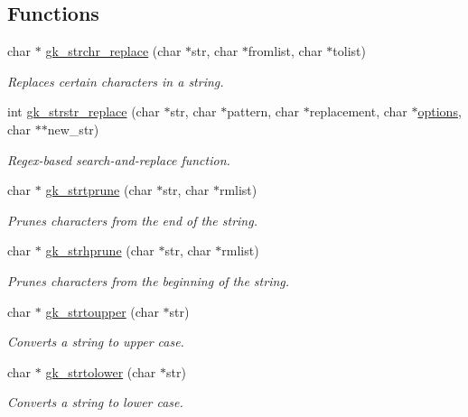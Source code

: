 \subsection*{Functions}
\begin{DoxyCompactItemize}
\item 
char $\ast$ \hyperlink{a00143_a29b909254dcbcae417f8c09ce21d5423}{gk\+\_\+strchr\+\_\+replace} (char $\ast$str, char $\ast$fromlist, char $\ast$tolist)
\begin{DoxyCompactList}\small\item\em Replaces certain characters in a string. \end{DoxyCompactList}\item 
int \hyperlink{a00143_a46e5cf8f76a1ece74adf1b8b9dfcb275}{gk\+\_\+strstr\+\_\+replace} (char $\ast$str, char $\ast$pattern, char $\ast$replacement, char $\ast$\hyperlink{a00879_a68c032ed4161802775c6847d4cb39adf}{options}, char $\ast$$\ast$new\+\_\+str)
\begin{DoxyCompactList}\small\item\em Regex-\/based search-\/and-\/replace function. \end{DoxyCompactList}\item 
char $\ast$ \hyperlink{a00143_a05261ee12d082a78cabc018d2f5e2266}{gk\+\_\+strtprune} (char $\ast$str, char $\ast$rmlist)
\begin{DoxyCompactList}\small\item\em Prunes characters from the end of the string. \end{DoxyCompactList}\item 
char $\ast$ \hyperlink{a00143_adf6c1dfa83b68cea7f048086e0a585c0}{gk\+\_\+strhprune} (char $\ast$str, char $\ast$rmlist)
\begin{DoxyCompactList}\small\item\em Prunes characters from the beginning of the string. \end{DoxyCompactList}\item 
char $\ast$ \hyperlink{a00143_ae2e962be7af156e5200766fa8543cff1}{gk\+\_\+strtoupper} (char $\ast$str)
\begin{DoxyCompactList}\small\item\em Converts a string to upper case. \end{DoxyCompactList}\item 
char $\ast$ \hyperlink{a00143_aa2d603de6c132e340d85e8e125d847a0}{gk\+\_\+strtolower} (char $\ast$str)
\begin{DoxyCompactList}\small\item\em Converts a string to lower case. \end{DoxyCompactList}\item 
$$
\end{DoxyCompactItemize}
